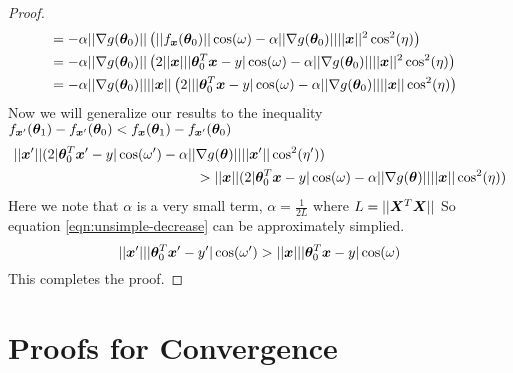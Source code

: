 \documentclass{article} %
\begin{document}
\begin{appendices}
\begin{proof}
\begin{align}
			&= -\alpha || \nabla g({\bm{\theta}}_0) || \left(|| f_{\bm{x}}({\bm{\theta}}_0) || \cos(\omega) - \alpha || \nabla g({\bm{\theta}}_0) || || {\bm{x}} ||^2 \cos^2(\eta)\right) &&\\
			&= -\alpha || \nabla g({\bm{\theta}}_0) || \left(2|| {\bm{x}} || | {\bm{\theta}}_0^T{\bm{x}} - y | \cos(\omega) - \alpha || \nabla g({\bm{\theta}}_0) || || {\bm{x}} ||^2 \cos^2(\eta)\right) &&\\
			&= -\alpha || \nabla g({\bm{\theta}}_0) || || {\bm{x}} || \left(2|| | {\bm{\theta}}_0^T{\bm{x}} - y | \cos(\omega) - \alpha || \nabla g({\bm{\theta}}_0) || || {\bm{x}} || \cos^2(\eta)\right) &&
		\end{align}
		\endgroup
		Now we will generalize our results to the inequality $f_{{\bm{x}}'}({\bm{\theta}}_1) - f_{{\bm{x}}'}({\bm{\theta}}_0) < f_{\bm{x}}({\bm{\theta}}_1) - f_{{\bm{x}}'}({\bm{\theta}}_0)$
		\begin{equation}
			\label{eqn:unsimple-decrease}
			\begin{split}
				|| {\bm{x}}' || (2 |{\bm{\theta}}_0^T{\bm{x}}'-y|\cos(\omega') - \alpha || & \nabla g({\bm{\theta}}) || || {\bm{x}}'|| \cos^2(\eta'))\\
				& > || {\bm{x}} || (2 |{\bm{\theta}}_0^T{\bm{x}}-y|\cos(\omega) - \alpha || \nabla g({\bm{\theta}}) || || {\bm{x}}|| \cos^2(\eta))
			\end{split}
		\end{equation}
		Here we note that $\alpha$ is a very small term, $\alpha = \frac{1}{2L}$ where $L = || {\bm{X}}^T {\bm{X}} ||$
		So equation \ref{eqn:unsimple-decrease} can be approximately simplied. 
		\begin{equation}
			|| {\bm{x}}' || |{\bm{\theta}}_0^T{\bm{x}}' - y'| \cos(\omega') > ||{\bm{x}}|| |{\bm{\theta}}_0^T{\bm{x}} - y| \cos(\omega)
		\end{equation}
		This completes the proof.
	\end{proof}

	\section{Proofs for Convergence}

\end{appendices}
\end{document}
